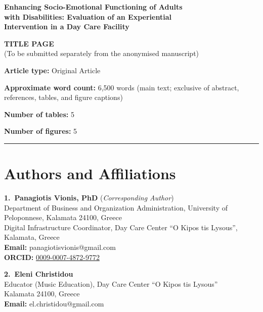 \documentclass[12pt,a4paper]{article}
\begin{document}
\begin{center}

{\Large\bfseries Enhancing Socio-Emotional Functioning of Adults\\[6pt]
with Disabilities: Evaluation of an Experiential\\[6pt]
Intervention in a Day Care Facility}

\vspace{1.5cm}

{\large\bfseries TITLE PAGE}\\[0.4cm]
{\small (To be submitted separately from the anonymised manuscript)}

\end{center}

\vspace{1.5cm}

\noindent\textbf{Article type:} Original Article

\noindent\textbf{Approximate word count:} 6,500 words (main text; exclusive of abstract, references, tables, and figure captions)

\noindent\textbf{Number of tables:} 5

\noindent\textbf{Number of figures:} 5

\vspace{1cm}

\noindent\rule{\textwidth}{0.4pt}

\section*{Authors and Affiliations}

\vspace{0.5cm}

\noindent\textbf{1.~Panagiotis Vionis, PhD} \quad (\textit{Corresponding Author})\\
Department of Business and Organization Administration, University of Peloponnese, Kalamata 24100, Greece\\
Digital Infrastructure Coordinator, Day Care Center ``O Kipos tis Lysous'', Kalamata, Greece\\
\textbf{Email:} panagiotisvionis@gmail.com\\
\textbf{ORCID:} \href{https://orcid.org/0009-0007-4872-9772}{0009-0007-4872-9772}

\vspace{0.8cm}

\noindent\textbf{2.~Eleni Christidou}\\
Educator (Music Education), Day Care Center ``O Kipos tis Lysous''\\
Kalamata 24100, Greece\\
\textbf{Email:} el.christidou@gmail.com
\end{document}
